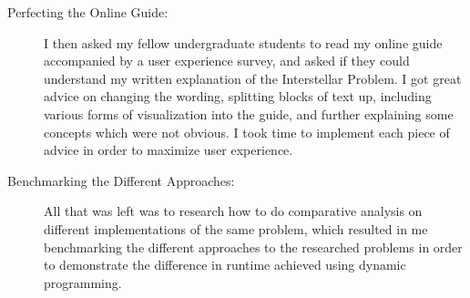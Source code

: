 \begin{description}
    \item[Perfecting the Online Guide:]
I then asked my fellow undergraduate students to read my online guide accompanied by a user experience survey,
and asked if they could understand my written explanation of the Interstellar Problem.
I got great advice on changing the wording, splitting blocks of text up, including various forms of visualization into the guide, and further explaining some concepts which were not obvious. I took time to implement each piece of advice in order to maximize user experience.

    \item[Benchmarking the Different Approaches:]
All that was left was to research how to do comparative analysis on different implementations of the same problem, which resulted in me benchmarking the different approaches to the researched problems in order to demonstrate the difference in runtime achieved using dynamic programming.
\end{description}